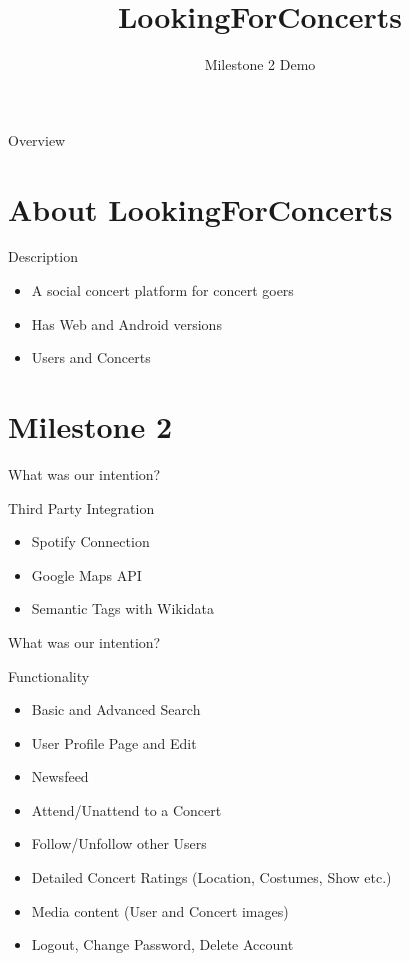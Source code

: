 \documentclass{beamer}
\title
  [LookingForConcerts]
  {LookingForConcerts}
\author
  []
  {Milestone 2 Demo}
\date
  {}
\institute
  {}
\begin{document}
\maketitle

\begin{frame}{Overview}

  \tableofcontents

\end{frame}

\section
  {About LookingForConcerts}

\begin{frame}{Description}
	\begin{block}{}
		\begin{itemize}
		\item A social concert platform for concert goers
		\item Has Web and Android versions
		\item Users and Concerts
		\end{itemize}
	\end{block}		
	
\end{frame}

\section
  {Milestone 2}

\begin{frame}{What was our intention?}
  \begin{block}{Third Party Integration}
    \begin{itemize}
  	\item Spotify Connection
  	\item Google Maps API
  	\item Semantic Tags with Wikidata
    \end{itemize}
  \end{block}
  
  
\end{frame}

\begin{frame}{What was our intention?}
	\begin{block}{Functionality}
	  	\begin{itemize}
	  		\item Basic and Advanced Search
	  		\item User Profile Page and Edit
			\item Newsfeed
	  		\item Attend/Unattend to a Concert
	  		\item Follow/Unfollow other Users
	  		\item Detailed Concert Ratings (Location, Costumes, Show etc.)
	  		\item Media content (User and Concert images)
	  		\item Logout, Change Password, Delete Account
	  	\end{itemize}
	\end{block}
\end{frame}
\end{document}
